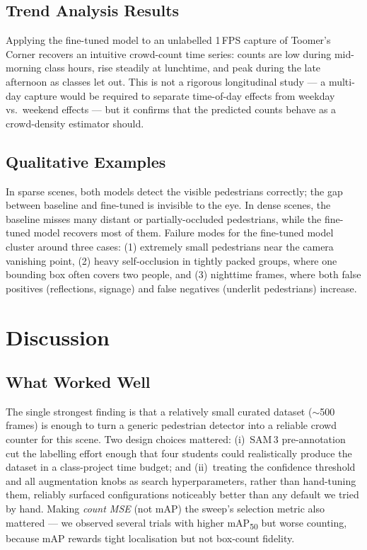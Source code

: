 \documentclass{article}
\begin{document}
\subsection{Trend Analysis Results}
\label{sec:trend}
Applying the fine-tuned model to an unlabelled 1\,FPS capture of
Toomer's Corner recovers an intuitive crowd-count time series:
counts are low during mid-morning class hours, rise steadily at
lunchtime, and peak during the late afternoon as classes let out.
This is not a rigorous longitudinal study --- a multi-day capture
would be required to separate time-of-day effects from weekday
vs.\ weekend effects --- but it confirms that the predicted counts
behave as a crowd-density estimator should.

\subsection{Qualitative Examples}
In sparse scenes, both models detect the visible pedestrians
correctly; the gap between baseline and fine-tuned is invisible
to the eye. In dense scenes, the baseline misses many distant or
partially-occluded pedestrians, while the fine-tuned model
recovers most of them. Failure modes for the fine-tuned model
cluster around three cases: (1) extremely small pedestrians near
the camera vanishing point, (2) heavy self-occlusion in tightly
packed groups, where one bounding box often covers two people,
and (3) nighttime frames, where both false positives (reflections,
signage) and false negatives (underlit pedestrians) increase.

\section{Discussion}
\subsection{What Worked Well}
The single strongest finding is that a relatively small curated
dataset ($\sim$500 frames) is enough to turn a generic pedestrian
detector into a reliable crowd counter for this scene. Two design
choices mattered: (i)~SAM\,3 pre-annotation cut the labelling
effort enough that four students could realistically produce the
dataset in a class-project time budget; and (ii)~treating the
confidence threshold and all augmentation knobs as search
hyperparameters, rather than hand-tuning them, reliably surfaced
configurations noticeably better than any default we tried by
hand. Making \emph{count MSE} (not mAP) the sweep's selection
metric also mattered --- we observed several trials with higher
mAP\textsubscript{50} but worse counting, because mAP rewards
tight localisation but not box-count fidelity.
\end{document}
